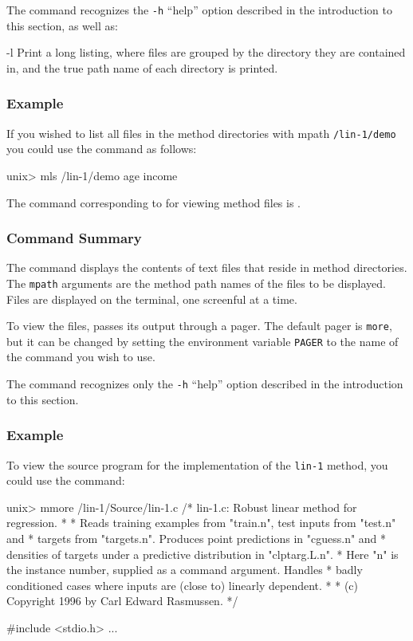 The \mls{} command recognizes the \texttt{-h} ``help'' option described in
the introduction to this section, as well as:
\begin{ttdescription}
\item[-l] 
    Print a long listing, where files are grouped by the directory
    they are contained in, and the true path name of each directory is
    printed.
\end{ttdescription}

\subsubsection*{Example}

If you wished to list all files in the method directories with mpath
\texttt{/lin-1/demo} you could use the \mls{} command as follows:
%
\begin{Session}
unix> mls /lin-1/demo
age income
\end{Session}

%
%


The command corresponding to \dmore{} for viewing \delve{} method
files is \mmore.

\subsubsection*{Command Summary}

The \mmore{} command displays the contents of text files that reside
in \delve{} method directories. The \texttt{mpath} arguments are the
method path names of the files to be displayed.  Files are displayed
on the terminal, one screenful at a time.

To view the files, \mmore{} passes its output through a pager.  The
default pager is \texttt{more}, but it can be changed by setting the
environment variable \texttt{PAGER} to the name of the command you
wish to use.

The \mmore{} command recognizes only the \texttt{-h} ``help'' option
described in the introduction to this section.

\subsubsection*{Example}

To view the source program for the implementation of the \texttt{lin-1}
method, you could use the command:
\begin{Session}
unix> mmore /lin-1/Source/lin-1.c
/* lin-1.c: Robust linear method for regression.  
 *
 * Reads training examples from "train.n", test inputs from "test.n" and
 * targets from "targets.n".  Produces point predictions in "cguess.n" and
 * densities of targets under a predictive distribution in "clptarg.L.n".
 * Here "n" is the instance number, supplied as a command argument. Handles
 * badly conditioned cases where inputs are (close to) linearly dependent.
 *
 * (c) Copyright 1996 by Carl Edward Rasmussen. */

#include <stdio.h>
...
\end{Session}

